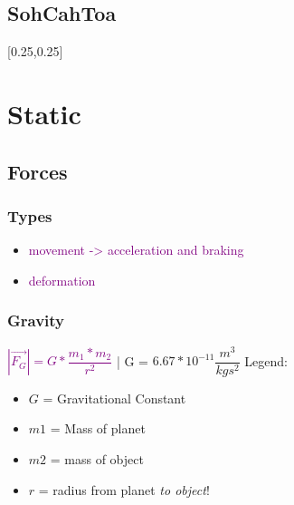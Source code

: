 \documentclass[main.tex,fontsize=8pt,paper=a4,paper=portrait,DIV=calc,]{scrartcl}
\begin{document}
\begin{multicols*}{2}
\subsection{SohCahToa}
[0.25,0.25]

\section{Static}
\subsection{Forces}
\subsubsection{Types}
\vspace{2mm}
\begin{itemize}
\item \textcolor{purple}{movement -> acceleration and braking}
\item \textcolor{purple}{deformation}

\end{itemize}

\subsubsection{Gravity}
\textcolor{purple}{\( |\vec{F_G}| = G * \dfrac{m_1 * m_2}{r^2} \)} | 
G = \(6.67 * 10^{-11}\dfrac{m^3}{kgs^2}\)\vspace{2mm}\newline
Legend: \newline
\begin{itemize}
\item \(G\) = Gravitational Constant
\item \(m1\) = Mass of planet
\item \(m2\) = mass of object
\item \(r\) = radius from planet \emph{to object}!
\end{itemize} 


\end{multicols*}
\end{document}
